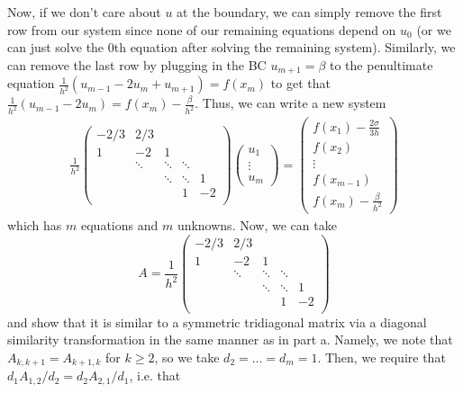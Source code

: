 \documentclass{article}
\begin{document}
Now, if we don't care about $u$ at the boundary, we can simply remove the first row from our system since none of our remaining equations depend on $u_0$ (or we can just solve the $0$th equation after solving the remaining system). Similarly, we can remove the last row by plugging in the BC $u_{m+1}=\beta$ to the penultimate equation $\frac{1}{h^2}(u_{m-1}-2u_m+u_{m+1})=f(x_m)$ to get that $\frac{1}{h^2}(u_{m-1}-2u_m)=f(x_m)-\frac{\beta}{h^2}$. Thus, we can write a new system
\begin{align*}
            \frac{1}{h^2}
            \begin{pmatrix}
                -2/3 & 2/3 \\
                1 &-2 &1\\
                & \ddots & \ddots & \ddots \\
                && \ddots & \ddots & 1\\
                &&& 1 & -2 \\
            \end{pmatrix}
            \begin{pmatrix}
                u_1 \\\vdots \\ u_{m}
            \end{pmatrix}
            =
            \begin{pmatrix}
                 f(x_1)-\frac{2\sigma}{3h}\\ f(x_2)\\ \vdots \\ f(x_{m-1}) \\ f(x_m)-\frac{\beta}{h^2}
            \end{pmatrix}
        \end{align*}
which has $m$ equations and $m$ unknowns. Now, we can take 
\[
A=\frac{1}{h^2}
            \begin{pmatrix}
                -2/3 & 2/3 \\
                1 &-2 &1\\
                & \ddots & \ddots & \ddots \\
                && \ddots & \ddots & 1\\
                &&& 1 & -2 \\
            \end{pmatrix}
\]
and show that it is similar to a symmetric tridiagonal matrix 
via a diagonal similarity transformation in the same manner as in part a. Namely, we note that $A_{k,k+1}=A_{k+1,k}$ for $k\geq2$, so we take $d_2=\ldots=d_m=1$. Then, we require that $d_1A_{1,2}/d_2=d_2A_{2,1}/d_1$, i.e. that 
\end{document}
